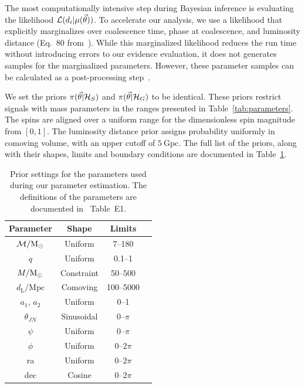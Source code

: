 \documentclass[%
 nofootinbib,
 amsmath,amssymb,
 aps,
 twocolumn
]{revtex4-2}
\newcommand{\mathcmd}[1]{{\sc \relax\ifmmode#1\else $#1$\fi}\xspace}
\newcommand{\msun}{\mathcmd{\text{M}_\odot}}
\newcommand{\parameters}{\mathcmd{\vec{\theta}}}
\newcommand{\template}{\mathcmd{\mu(\parameters)}}
\begin{document}
The most computationally intensive step during Bayesian inference is evaluating the likelihood $\mathcal{L}(d_i|\template)$. To accelerate our analysis, we use a likelihood that explicitly marginalizes over coalescence time, phase at coalescence, and luminosity distance (Eq.~80 from~\citet{intro_to_gw_bayes}). While this marginalized likelihood reduces the run time without introducing errors to our evidence evaluation, it does not generates samples for the marginalized parameters. However, these parameter samples can be calculated as a post-processing step~\cite{intro_to_gw_bayes}.

We set the priors $\pi(\parameters|\mathcal{H}_S)$ and $\pi(\parameters|\mathcal{H}_G)$ to be identical. These priors restrict signals with mass parameters in the ranges presented in Table~\ref{tab:parameters}. The spins are aligned over a uniform range for the dimensionless spin magnitude from $\left[0,1\right]$. The luminosity distance prior assigns probability uniformly in comoving volume, with an upper cutoff of $5\ \text{Gpc}$. The full list of the priors, along with their shapes, limits and boundary conditions are documented in Table~\ref{tab:priors}. 

\begin{table}
    \centering
    \caption{
    Prior settings for the parameters used during our parameter estimation. The definitions of the parameters are documented in \citet{bilby_gwtc}~Table~E1.\label{tab:priors}}
    \begin{tabular}{c c c c}
    \hline
    Parameter & Shape & Limits \\
    \hline
          $\mathcal{M}/\msun$           & Uniform & 7--180  \\
          $q$                           & Uniform & 0.1--1  \\
          $M/\msun$                     & Constraint & 50--500  \\
          $d_\mathrm{L}/\mathrm{Mpc}$   & Comoving & 100--5000  \\
          $a_1$, $a_2$                  & Uniform & 0--1  \\
          $\theta_{JN}$                 & Sinusoidal & 0--$\pi$  \\
          $\psi$                        & Uniform & 0--$\pi$  \\
          $\phi$                        & Uniform & 0--$2\pi$  \\
          ra                            & Uniform & 0--$2\pi$  \\
          dec                           & Cosine & 0--$2\pi$  \\
    \hline
    \end{tabular}
\end{table}
\end{document}
